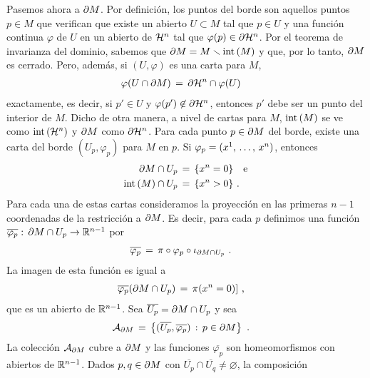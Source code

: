 Pasemos ahora a $\borde[M]$. Por definici\'{o}n, los puntos del borde son
aquellos puntos $p\in M$ que verifican que existe un abierto $U\subset M$
tal que $p\in U$ y una funci\'{o}n continua $\varphi$ de $U$ en un
abierto de $\hemi[n]$ tal que $\varphi(p)\in\borde[{\hemi[n]}]$. Por el teorema
de invarianza del dominio, sabemos que $\borde[M]=M\setmin\interior{M}$ y
que, por lo tanto, $\borde[M]$ es cerrado. Pero, adem\'{a}s, si $(U,\varphi)$
es una carta para $M$,
\begin{align*}
	\varphi(U\cap\borde[M]) & \,=\,\borde[{\hemi[n]}]\cap\varphi(U)
\end{align*}
%
exactamente, es decir, si $p'\in U$ y $\varphi(p')\not\in\borde[{\hemi[n]}]$,
entonces $p'$ debe ser un punto del interior de $M$. Dicho de otra manera,
a nivel de cartas para $M$, $\interior{M}$ se ve como $\interior{\hemi[n]}$
y $\borde[M]$ como $\borde[{\hemi[n]}]$. Para cada punto $p\in\borde[M]$
del borde, existe una carta del borde $(U_{p},\varphi_{p})$ para $M$ en
$p$. Si $\varphi_{p}=(\lista*{x}{n})$, entonces
\begin{align*}
	\borde[M]\cap U_{p} & \,=\,\{x^{n}=0\}\quad\text{e} \\
	\interior{M}\cap U_{p} & \,=\,\{x^{n}>0\}
	\text{ .}
\end{align*}
%
Para cada una de estas cartas consideramos la proyecci\'{o}n en las primeras
$n-1$ coordenadas de la restricci\'{o}n a $\borde[M]$. Es decir, para cada
$p$ definimos una funci\'{o}n $\overline{\varphi_{p}}:\,%
\borde[M]\cap U_{p}\rightarrow\bb{R}^{n-1}$ por
\begin{align*}
	\overline{\varphi_{p}} & \,=\,\pi\circ\varphi_{p}\circ
		\inc[{\borde[M]}\cap U_{p}]
	\text{ .}
\end{align*}
%
La imagen de esta funci\'{o}n es igual a
\begin{align*}
	\overline{\varphi_{p}}(\borde[M]\cap U_{p}) & \,=\,\pi(x^{n}=0)]
	\text{ ,}
\end{align*}
%
que es un abierto de $\bb{R}^{n-1}$. Sea
$\overline{U_{p}}=\borde[M]\cap U_{p}$ y sea
\begin{align*}
	\cal{A}_{\borde[M]} & \,=\,\left\lbrace
		(\overline{U_{p}},\overline{\varphi_{p}})\,:\,
		p\in\borde[M]\right\rbrace
	\text{ .}
\end{align*}
%
La colecci\'{o}n $\cal{A}_{\borde[M]}$ cubre a $\borde[M]$ y las funciones
$\overline{\varphi_{p}}$ son homeomorfismos con abiertos de $\bb{R}^{n-1}$.
Dados $p,q\in\borde[M]$ con
$\overline{U_{p}}\cap\overline{U_{q}}\not=\varnothing$, la composici\'{o}n
